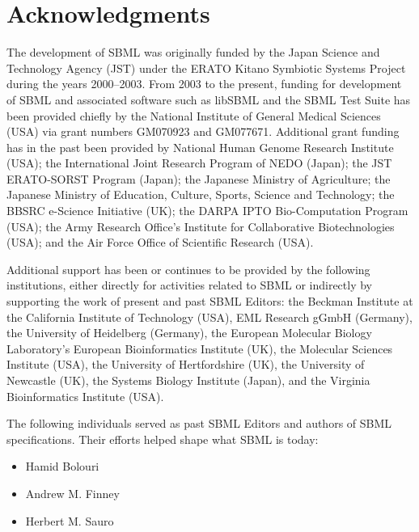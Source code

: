 
\section{Acknowledgments}
\label{sec:acknowledgements}
\label{sec:acknowledgments}

The development of SBML was originally funded by the Japan Science
and Technology Agency (JST) under the ERATO Kitano Symbiotic
Systems Project during the years 2000--2003.  From 2003 to the
present, funding for development of SBML and associated software
such as libSBML and the SBML Test Suite has been provided chiefly
by the National Institute of General Medical Sciences (USA) via
grant numbers GM070923 and GM077671.  Additional grant funding has
in the past been provided by National Human Genome Research
Institute (USA); the International Joint Research Program of NEDO
(Japan); the JST ERATO-SORST Program (Japan); the Japanese
Ministry of Agriculture; the Japanese Ministry of Education,
Culture, Sports, Science and Technology; the BBSRC e-Science
Initiative (UK); the DARPA IPTO Bio-Computation Program (USA); the
Army Research Office's Institute for Collaborative Biotechnologies
(USA); and the Air Force Office of Scientific Research (USA).

Additional support has been or continues to be provided by the
following institutions, either directly for activities related to
SBML or indirectly by supporting the work of present and past SBML
Editors: the Beckman Institute at the California Institute of
Technology (USA), EML Research gGmbH (Germany), the University of
Heidelberg (Germany), the European Molecular Biology Laboratory's
European Bioinformatics Institute (UK), the Molecular Sciences
Institute (USA), the University of Hertfordshire (UK), the
University of Newcastle (UK), the Systems Biology Institute
(Japan), and the Virginia Bioinformatics Institute (USA).

The following individuals served as past SBML Editors and authors
of SBML specifications.  Their efforts helped shape what SBML is
today:
\begin{itemize}\setlength{\parskip}{-0.2ex}

\item Hamid Bolouri
\item Andrew M. Finney
\item Herbert M. Sauro

\end{itemize}

